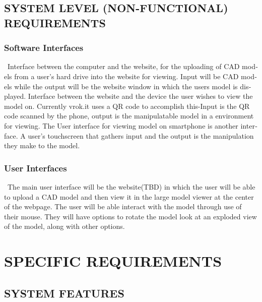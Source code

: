 \documentclass[letterpaper, 10pt, draftclsnofoot, compsoc, onecolumn]{IEEEtran}
\begin{document}
{\subsection[SYSTEM LEVEL (NON{}-FUNCTIONAL)
REQUIREMENTS]{\rmfamily\bfseries\color{black}
SYSTEM LEVEL (NON-FUNCTIONAL) REQUIREMENTS}

\subsubsection[Software
Interfaces]{\rmfamily\bfseries\color{black}
Software Interfaces}
{\color{black}
\foreignlanguage{english}{\ }\foreignlanguage{english}{Interface between the computer and the website, for the uploading of CAD models from a user's hard drive into the website for viewing. Input will be CAD models while the output will be the website window in which the users model is displayed. Interface between the website and the device the user wishes to view the model on. Currently vrok.it uses a QR code to accomplish this-Input is the QR code scanned by the phone, output is the manipulatable model in a environment for viewing. The User interface for viewing model on smartphone is another interface. A user's touchscreen that gathers input and the output is the manipulation they make to the model.
}}

\subsubsection[User
Interfaces]{\rmfamily\bfseries\color{black}
User Interfaces}
{\color{black}
\foreignlanguage{english}{\ }\foreignlanguage{english}{The main user interface will be the website(TBD) in which the user will be able to upload a CAD model and then view it in the large model viewer at the center of the webpage. The user will be able interact with the model through use of their mouse. They will have options to rotate the model look at an exploded view of the model, along with other options. }}


\section[SPECIFIC
REQUIREMENTS]{\rmfamily\bfseries\color{black}
SPECIFIC REQUIREMENTS}
\bigskip

\subsection[SYSTEM
FEATURES]{\rmfamily\bfseries\color{black}
SYSTEM FEATURES}
\medskip

}
\end{document}
